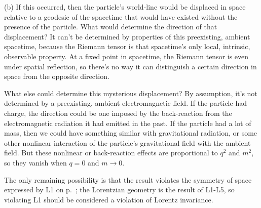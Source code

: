 (b) If this occurred, then the particle's world-line would be displaced in space relative
to a geodesic of the spacetime that would have existed without the presence of the particle.
What would determine the direction of that displacement?
It can't be determined by properties of this preexisting, ambient spacetime, because
the Riemann tensor is that spacetime's only local, intrinsic, observable property.
At a fixed point in spacetime, the Riemann tensor is even under spatial reflection, so there's no way it can distinguish
a certain direction in space from the opposite direction.

What else could determine this mysterious displacement?
By assumption, it's not determined by a preexisting, ambient electromagnetic field.
If the particle had charge, the direction could be one imposed by the back-reaction from the electromagnetic
radiation it had emitted in the past. If the particle had a lot of mass, then we could have
something similar with gravitational radiation, or some other nonlinear interaction of the
particle's gravitational field with the ambient field. But these nonlinear or back-reaction
effects are proportional to $q^2$ and $m^2$, so they vanish when $q=0$ and $m\rightarrow 0$.

The only remaining possibility is that the result violates the symmetry of space expressed by L1 on p.~\pageref{sec:lorentz-geometry};
the Lorentzian geometry is the result of L1-L5, so violating L1 should be considered a violation of Lorentz
invariance.

